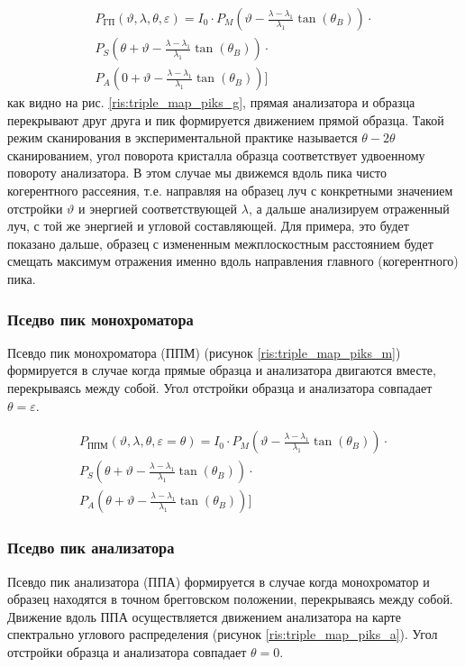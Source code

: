 \begin{eqnarray} \label{eq:triplr_spectra_angle_map_GP}
  P_{\text{ГП}}(\vartheta,\lambda,\theta,\varepsilon) =I_0\cdot
    P_M \left(\vartheta - \frac{\lambda - \lambda_1}{\lambda_1}\tan(\theta_B) \right) \cdot \nonumber \\
   P_S \left(\theta + \vartheta - \frac{\lambda - \lambda_1}{\lambda_1}\tan(\theta_B)\right)  \cdot  \nonumber \\
   P_A \left(0+\vartheta - \frac{\lambda - \lambda_1}{\lambda_1}\tan(\theta_B)\right) \Bigg]
 \end{eqnarray}
как видно на рис. \ref{ris:triple_map_piks_g}, прямая анализатора и образца перекрывают друг друга и пик формируется
движением прямой образца. Такой режим сканирования в экспериментальной практике называется $\theta-2\theta$ сканированием,
угол поворота кристалла образца соответствует удвоенному повороту анализатора. В этом случае мы движемся
вдоль пика чисто когерентного рассеяния, т.е. направляя на образец луч с конкретными значением отстройки $\vartheta$ и энергией соответствующей
 $\lambda$, а дальше анализируем отраженный луч, с той же энергией и угловой составляющей. Для примера, это
 будет показано дальше, образец с измененным межплоскостным расстоянием будет смещать максимум отражения именно вдоль направления
 главного (когерентного) пика.

\subsubsection*{Пседво пик монохроматора}
Псевдо пик монохроматора (ППМ) (рисунок \ref{ris:triple_map_piks_m}) формируется в случае когда прямые образца и анализатора
двигаются вместе, перекрываясь между собой. Угол отстройки образца и анализатора совпадает $\theta = \varepsilon$.

\begin{eqnarray} \label{eq:triplr_spectra_angle_map_PPM}
  P_{\text{ППМ}}(\vartheta,\lambda,\theta,\varepsilon = \theta) =I_0\cdot
    P_M \left(\vartheta - \frac{\lambda - \lambda_1}{\lambda_1}\tan(\theta_B) \right) \cdot \nonumber \\
   P_S \left(\theta + \vartheta - \frac{\lambda - \lambda_1}{\lambda_1}\tan(\theta_B)\right)  \cdot  \nonumber \\
   P_A \left(\theta  + \vartheta - \frac{\lambda - \lambda_1}{\lambda_1}\tan(\theta_B)\right) \Bigg]
 \end{eqnarray}

 \subsubsection*{Пседво пик анализатора}
 Псевдо пик анализатора (ППА) формируется в случае когда монохроматор и образец
 находятся в точном брегговском положении, перекрываясь между собой. Движение вдоль ППА осуществляется
 движением анализатора  на карте спектрально углового распределения (рисунок \ref{ris:triple_map_piks_a}).
   Угол отстройки образца и анализатора совпадает $\theta = 0$.

